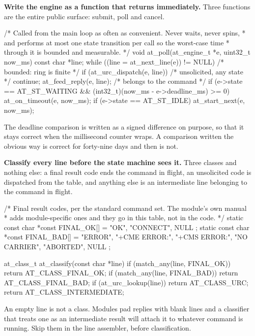 \begin{steps}
\item \textbf{Write the engine as a function that returns immediately.} Three
functions are the entire public surface: submit, poll and cancel.
\begin{ccode}
/* Called from the main loop as often as convenient. Never waits, never spins,
 * and performs at most one state transition per call so the worst-case time
 * through it is bounded and measurable.                                     */
void at_poll(at_engine_t *e, uint32_t now_ms)
{
    const char *line;
    while ((line = at_next_line(e)) != NULL) {     /* bounded: ring is finite */
        if (at_urc_dispatch(e, line))              /* unsolicited, any state  */
            continue;
        at_feed_reply(e, line);                    /* belongs to the command  */
    }
    if (e->state == AT_ST_WAITING && (int32_t)(now_ms - e->deadline_ms) >= 0)
        at_on_timeout(e, now_ms);
    if (e->state == AT_ST_IDLE)
        at_start_next(e, now_ms);
}
\end{ccode}
The deadline comparison is written as a signed difference on purpose, so that it
stays correct when the millisecond counter wraps. A comparison written the
obvious way is correct for forty-nine days and then is not.

\item \textbf{Classify every line before the state machine sees it.} Three
classes and nothing else: a final result code ends the command in flight, an
unsolicited code is dispatched from the table, and anything else is an
intermediate line belonging to the command in flight.
\begin{ccode}
/* Final result codes, per the standard command set. The module's own manual
 * adds module-specific ones and they go in this table, not in the code.    */
static const char *const FINAL_OK[]  = { "OK", "CONNECT", NULL };
static const char *const FINAL_BAD[] = { "ERROR", "+CME ERROR:", "+CMS ERROR:",
                                         "NO CARRIER", "ABORTED", NULL };

at_class_t at_classify(const char *line)
{
    if (match_any(line, FINAL_OK))  return AT_CLASS_FINAL_OK;
    if (match_any(line, FINAL_BAD)) return AT_CLASS_FINAL_BAD;
    if (at_urc_lookup(line))        return AT_CLASS_URC;
    return AT_CLASS_INTERMEDIATE;
}
\end{ccode}
An empty line is not a class. Modules pad replies with blank lines and a
classifier that treats one as an intermediate result will attach it to whatever
command is running. Skip them in the line assembler, before classification.


\end{steps}
